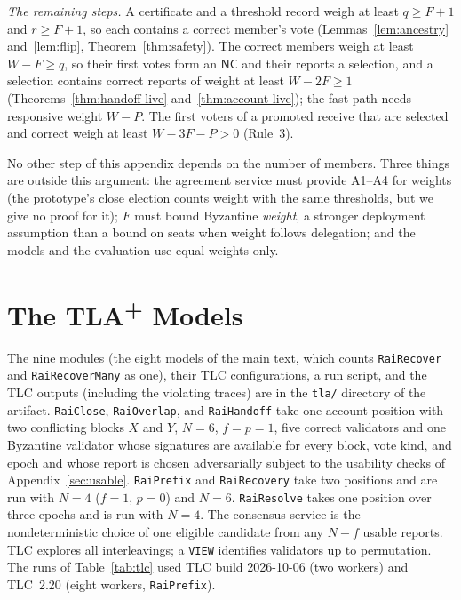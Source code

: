 \documentclass[conference]{IEEEtran}
\newcommand{\NC}{\mathsf{NC}}
\begin{document}
\emph{The remaining steps.} A certificate and a threshold record weigh at least $q\ge F+1$ and $r\ge F+1$, so each contains a correct member's vote (Lemmas~\ref{lem:ancestry} and~\ref{lem:flip}, Theorem~\ref{thm:safety}). The correct members weigh at least $W-F\ge q$, so their first votes form an $\NC$ and their reports a selection, and a selection contains correct reports of weight at least $W-2F\ge1$ (Theorems~\ref{thm:handoff-live} and~\ref{thm:account-live}); the fast path needs responsive weight $W-P$. The first voters of a promoted receive that are selected and correct weigh at least $W-3F-P>0$ (Rule~3).

No other step of this appendix depends on the number of members. Three things are outside this argument: the agreement service must provide A1--A4 for weights (the prototype's close election counts weight with the same thresholds, but we give no proof for it); $F$ must bound Byzantine \emph{weight}, a stronger deployment assumption than a bound on seats when weight follows delegation; and the models and the evaluation use equal weights only.

\section{The TLA\textsuperscript{+} Models}
\label{app:models}
\label{sec:mc}
The nine modules (the eight models of the main text, which counts \texttt{RaiRecover} and \texttt{RaiRecoverMany} as one), their TLC configurations, a run script, and the TLC outputs (including the violating traces) are in the \texttt{tla/} directory of the artifact. \texttt{RaiClose}, \texttt{RaiOverlap}, and \texttt{RaiHandoff} take one account position with two conflicting blocks $X$ and $Y$, $N=6$, $f=p=1$, five correct validators and one Byzantine validator whose signatures are available for every block, vote kind, and epoch and whose report is chosen adversarially subject to the usability checks of Appendix~\ref{sec:usable}. \texttt{RaiPrefix} and \texttt{RaiRecovery} take two positions and are run with $N=4$ ($f=1$, $p=0$) and $N=6$. \texttt{RaiResolve} takes one position over three epochs and is run with $N=4$. The consensus service is the nondeterministic choice of one eligible candidate from any $N-f$ usable reports. TLC explores all interleavings; a \texttt{VIEW} identifies validators up to permutation. The runs of Table~\ref{tab:tlc} used TLC build 2026-10-06 (two workers) and TLC~2.20 (eight workers, \texttt{RaiPrefix}).
\end{document}
